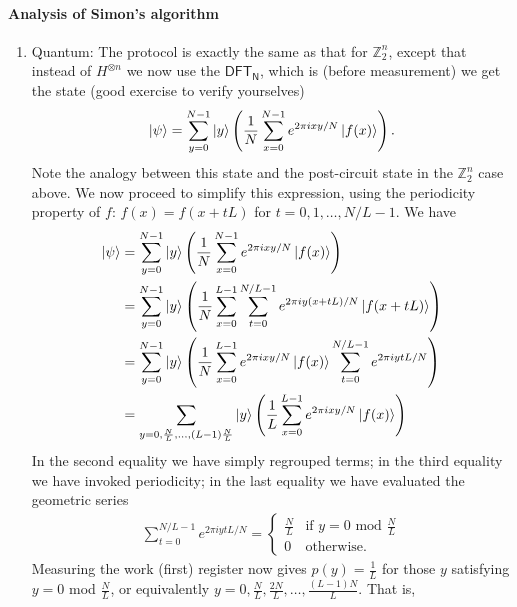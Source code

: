 \paragraph{Analysis of Simon's algorithm}
\begin{enumerate}
    \item Quantum: The protocol is exactly the same as that for $\mathbb{Z}_2^n$, except that instead of $H^{\otimes n}$ we now use the $\mathsf{DFT_N}$, which is (before measurement) we get the state (good exercise to verify yourselves)
    \begin{align*}
        \ket{\psi} = \sum_{y=0}^{N-1} \ket{y} \left( \frac{1}{N} \sum_{x=0}^{N-1} e^{2\pi i xy/N} \ket{f(x)} \right).
    \end{align*}
    Note the analogy between this state and the post-circuit state in the $\mathbb{Z}_2^n$ case above. We now proceed to simplify this expression, using the periodicity property of $f$: $f(x)=f(x+tL)$ for $t=0,1,\dots,N/L-1$. We have
    \begin{align*}
        \ket{\psi} &= \sum_{y=0}^{N-1} \ket{y} \left( \frac{1}{N} \sum_{x=0}^{N-1} e^{2\pi i xy/N} \ket{f(x)} \right)\\
        &= \sum_{y=0}^{N-1} \ket{y} \left( \frac{1}{N} \sum_{x=0}^{L-1} \sum_{t=0}^{N/L-1} e^{2\pi i y(x+tL)/N} \ket{f(x+tL)} \right)\\
        &= \sum_{y=0}^{N-1} \ket{y} \left( \frac{1}{N} \sum_{x=0}^{L-1} e^{2\pi i xy/N} \ket{f(x)} \sum_{t=0}^{N/L-1} e^{2\pi i ytL/N} \right)\\
        &= \sum_{y=0,\frac{N}{L},\dots,(L-1)\frac{N}{L}} \ket{y} \left( \frac{1}{L} \sum_{x=0}^{L-1} e^{2\pi i xy/N} \ket{f(x)} \right)
    \end{align*}
    In the second equality we have simply regrouped terms; in the third equality we have invoked periodicity; in the last equality we have evaluated the geometric series
    \begin{align*}
        \sum_{t=0}^{N/L-1} e^{2\pi i ytL/N}=
        \begin{cases}
            \frac{N}{L} & \text{if } y=0 \text{ mod } \frac{N}{L}\\
            0 & \text{otherwise.}
        \end{cases}
    \end{align*}
    Measuring the work (first) register now gives $p(y)=\frac{1}{L}$ for those $y$ satisfying $y=0$ mod $\frac{N}{L}$, or equivalently $y=0,\frac{N}{L},\frac{2N}{L},\dots, \frac{(L-1)N}{L}$. That is,
    \begin{align*}

\end{align*}
\end{enumerate}
